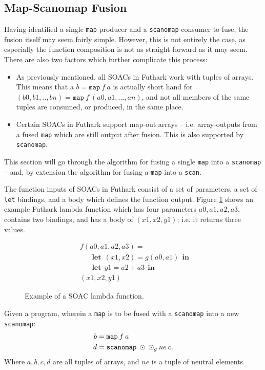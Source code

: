 \documentclass[11pt,bibliography=totocnumbered]{article}
\newcommand\lett{\phantom{-}\:\:\mathbf{let}\:\:}
\newcommand\inn{\:\:\mathbf{in}\:\:}
\begin{document}
\subsection{Map-Scanomap Fusion}\label{sec:mapscanomapfus}
\setcounter{equation}{0}
Having identified a single \texttt{map} producer and a \texttt{scanomap} consumer to fuse, the fusion itself may seem fairly simple.
 However, this is not entirely the case, as especially the function composition is not as straight forward as it may seem. There are also two factors
 which further complicate this process:
 \begin{itemize}
 \item As previously mentioned, all SOACs in Futhark work with tuples of arrays. This means that a $b = \mathtt{map}\: f \: a$ is actually short hand for
$(b0, b1, .. ,bn) = \mathtt{map} \: f \: (a0, a1, ..., an)$, and not all members of the same tuples are consumed, or produced, in the same place.
 \item Certain SOACs in Futhark support map-out arrays -- i.e. array-outputs from a fused \texttt{map} which are still output after fusion. This is also
 supported by \texttt{scanomap}. 
 \end{itemize}
This section will go through the algorithm for fusing a single \texttt{map} into a \texttt{scanomap} -- and, by extension the algorithm for fusing a \texttt{map} into a \texttt{scan}.

The function inputs of SOACs in Futhark consist of a set of parameters, a set of \texttt{let} bindings, and a body which defines the function output. Figure \ref{fig:example1} shows an
 example Futhark lambda function which has four parameters $a0, a1, a2, a3$, contains two bindings, and has a body of $(x1, x2, y1)$; i.e. it returns three values.
\begin{figure}[h!]
  \centering
  \begin{align}
    &f (a0, a1, a2, a3) = \\
    &\lett (x1,x2) = g(a0, a1) \inn \\
    &\lett y1 = a2 + a3 \inn \\
    &(x1, x2, y1)
  \end{align}
  \caption{Example of a SOAC lambda function.}\label{fig:example1}
\end{figure}
 Given a program, wherein a \texttt{map} is to be fused with a \texttt{scanomap} into a new \texttt{scanomap}:
\begin{align*}
b &= \mathtt{map} \: f \: a \\
d &= \mathtt{scanomap} \: \odot \: \odot_g \: ne \: c \mathnormal{.}  
\end{align*}
Where $a, b, c, d$ are all tuples of arrays, and $ne$ is a tuple of neutral elements.
\end{document}
